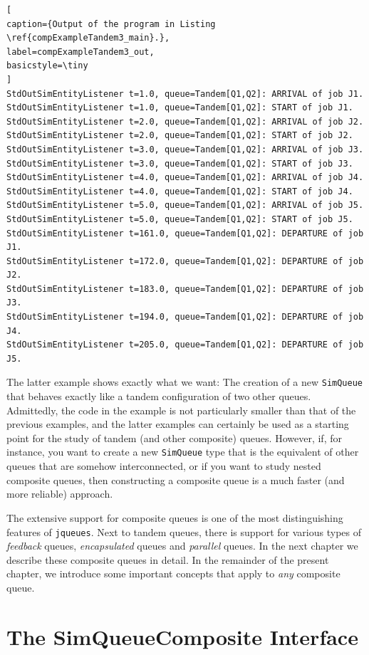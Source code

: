 \documentclass[12pt]{book}
\begin{document}
\begin{lstlisting}[
caption={Output of the program in Listing \ref{compExampleTandem3_main}.},
label=compExampleTandem3_out,
basicstyle=\tiny
]
StdOutSimEntityListener t=1.0, queue=Tandem[Q1,Q2]: ARRIVAL of job J1.
StdOutSimEntityListener t=1.0, queue=Tandem[Q1,Q2]: START of job J1.
StdOutSimEntityListener t=2.0, queue=Tandem[Q1,Q2]: ARRIVAL of job J2.
StdOutSimEntityListener t=2.0, queue=Tandem[Q1,Q2]: START of job J2.
StdOutSimEntityListener t=3.0, queue=Tandem[Q1,Q2]: ARRIVAL of job J3.
StdOutSimEntityListener t=3.0, queue=Tandem[Q1,Q2]: START of job J3.
StdOutSimEntityListener t=4.0, queue=Tandem[Q1,Q2]: ARRIVAL of job J4.
StdOutSimEntityListener t=4.0, queue=Tandem[Q1,Q2]: START of job J4.
StdOutSimEntityListener t=5.0, queue=Tandem[Q1,Q2]: ARRIVAL of job J5.
StdOutSimEntityListener t=5.0, queue=Tandem[Q1,Q2]: START of job J5.
StdOutSimEntityListener t=161.0, queue=Tandem[Q1,Q2]: DEPARTURE of job J1.
StdOutSimEntityListener t=172.0, queue=Tandem[Q1,Q2]: DEPARTURE of job J2.
StdOutSimEntityListener t=183.0, queue=Tandem[Q1,Q2]: DEPARTURE of job J3.
StdOutSimEntityListener t=194.0, queue=Tandem[Q1,Q2]: DEPARTURE of job J4.
StdOutSimEntityListener t=205.0, queue=Tandem[Q1,Q2]: DEPARTURE of job J5.
\end{lstlisting}

The latter example shows exactly what we want:
  The creation of a new \lstinline|SimQueue|
  that behaves exactly like a tandem configuration of two other queues.
Admittedly, the code in the example is not particularly smaller
  than that of the previous examples,
  and the latter examples can certainly be used as a starting point
  for the study of tandem (and other composite) queues.
However, if, for instance, you want to create a new \lstinline|SimQueue| type
  that is the equivalent of other queues that are somehow interconnected,
  or if you want to study nested composite queues,
  then constructing a composite queue is a much faster
  (and more reliable) approach.

The extensive support for composite queues
  is one of the most distinguishing features of \lstinline|jqueues|.
Next to tandem queues, there is support for various types of
  {\em feedback\/} queues, {\em encapsulated\/} queues
  and {\em parallel\/} queues.
In the next chapter we describe these composite queues in detail.
In the remainder of the present chapter,
  we introduce some important concepts that
  apply to {\em any\/} composite queue.

\section{The SimQueueComposite Interface}
\end{document}
